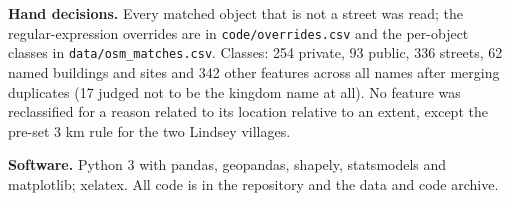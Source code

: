 \documentclass[11pt,a4paper]{article}
\begin{document}
\textbf{Hand decisions.} Every matched object that is not a street was read; the regular-expression overrides are in \texttt{code/overrides.csv} and the per-object classes in \texttt{data/osm\_matches.csv}. Classes: 254 private, 93 public, 336 streets, 62 named buildings and sites and 342 other features across all names after merging duplicates (17 judged not to be the kingdom name at all). No feature was reclassified for a reason related to its location relative to an extent, except the pre-set 3 km rule for the two Lindsey villages.

\textbf{Software.} Python 3 with pandas, geopandas, shapely, statsmodels and matplotlib; xelatex. All code is in the repository and the data and code archive.
\end{document}
